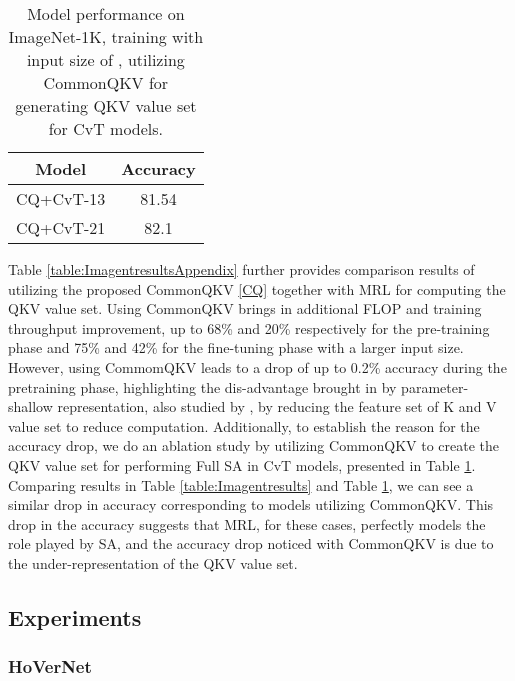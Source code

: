 \documentclass{article}
\begin{document}
\begin{table}[htbp]
  \centering
  \caption{Model performance on ImageNet-1K, training with input size of , utilizing CommonQKV for generating QKV value set for CvT models.}\label{table:CQCvT}
    \begin{tabular}{c|c}
    \toprule
    Model & Accuracy \\
    \midrule
    CQ+CvT-13 & 81.54 \\
    CQ+CvT-21 & 82.1 \\
    \end{tabular}\end{table}

Table \ref{table:ImagentresultsAppendix} further provides comparison results of utilizing the proposed CommonQKV \ref{CQ} together with MRL for computing the QKV value set. Using CommonQKV brings in additional FLOP and training throughput improvement, up to 68\% and 20\% respectively for the pre-training phase and 75\% and 42\% for the fine-tuning phase with a larger input size. However, using CommomQKV leads to a drop of up to 0.2\% accuracy during the pretraining phase, highlighting the dis-advantage brought in by parameter-shallow representation, also studied by \cite{DBLP:journals/corr/CvT}, by reducing the feature set of K and V value set to reduce computation. Additionally, to establish the reason for the accuracy drop, we do an ablation study by utilizing CommonQKV to create the QKV value set for performing Full SA in CvT models, presented in Table \ref{table:CQCvT}. Comparing results in Table \ref{table:Imagentresults} and Table \ref{table:CQCvT}, we can see a similar drop in accuracy corresponding to models utilizing CommonQKV. This drop in the accuracy suggests that MRL, for these cases, perfectly models the role played by SA, and the accuracy drop noticed with CommonQKV is due to the under-representation of the QKV value set. 

\subsection{Experiments}
\subsubsection{HoVerNet} \label{Appen:HoverNet}
\end{document}
